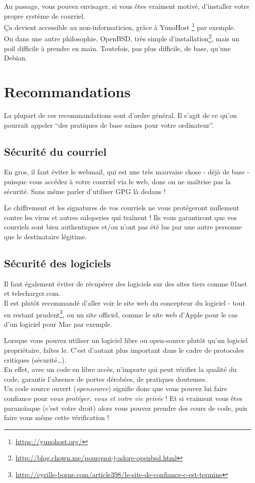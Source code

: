Au passage, vous pouvez envisager, si vous êtes vraiment motivé,
d'installer votre propre système de courriel.\\Ça devient accessible au
non-informaticien, grâce à YunoHost \footnote{\url{https://yunohost.org/}} par
exemple.\\Ou dans une autre philosophie, OpenBSD, très simple
d'installation\footnote{\url{http://blog.chown.me/pourquoi-j-adore-openbsd.html}}, mais un poil difficile à prendre en main. Toutefois, pas plus difficile, de base, qu'une Debian.

\section{Recommandations}\label{recommandations}

\begin{notice}
La plupart de ces recommandations sont d'ordre général. Il s'agit de ce
qu'on pourrait appeler ``des pratiques de base saines pour votre
ordinateur''.
\end{notice}

\subsection{Sécurité du courriel}
En gros, il faut éviter le webmail, qui est une très mauvaise chose -
déjà de base - puisque vous accédez à votre courriel via le web, donc on
ne maîtrise pas la sécurité. Sans même parler d'utiliser GPG là dedans !

Le chiffrement et les signatures de vos courriels ne vous protégeront
nullement contre les virus et autres saloperies qui traînent ! Ils vous
garantiront que vos courriels sont bien authentiques et/ou n'ont pas été
lus par une autre personne que le destinataire légitime.

\subsection{Sécurité des logiciels}
Il faut également éviter de récupérer des logiciels sur des sites tiers
comme 01net et telecharger.com.\\Il est plutôt recommandé d'aller voir
le site web du concepteur du logiciel - tout en restant prudent\footnote{\url{http://cyrille-borne.com/article398/le-site-de-confiance-c-est-termine}}, ou un site officiel, comme le site web d'Apple pour le cas d'un logiciel pour Mac
par exemple.

Lorsque vous pouvez utiliser un logiciel libre ou open-source plutôt
qu'un logiciel propriétaire, faîtes le. C'est d'autant plus important
dans le cadre de protocoles critiques (sécurité\ldots{}).\\En effet,
avec un code en libre accès, n'importe qui peut vérifier la qualité du
code, garantir l'absence de portes dérobées, de pratiques douteuses.\\Un
code source ouvert (\emph{opensource}) signifie donc que vous pouvez lui
faire confiance pour \emph{vous protéger, vous et votre vie privée} ! Et
si vraiment vous êtes paranoïaque (c'est votre droit) alors vous pouvez
prendre des cours de code, puis faire vous même cette vérification !


